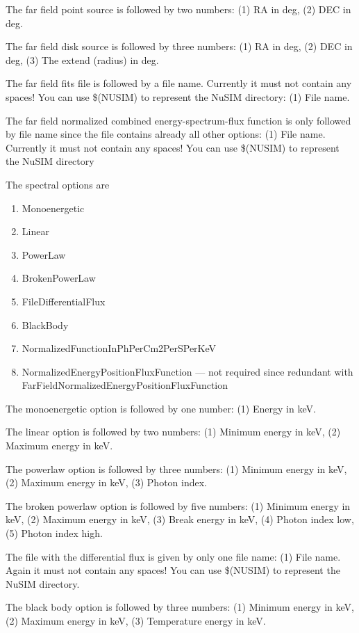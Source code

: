 The far field point source is followed by two numbers: (1) RA in deg, (2) DEC in deg.

The far field disk source is followed by three numbers: (1) RA in deg, (2) DEC in deg, (3) The extend (radius) in deg.

The far field fits file is followed by a file name. Currently it must not contain any spaces! You can use \$(NUSIM) to represent the NuSIM directory: (1) File name.

The far field normalized combined energy-spectrum-flux function is only followed by file name since the file contains already all other options: (1) File name. Currently it must not contain any spaces! You can use \$(NUSIM) to represent the NuSIM directory


The spectral options are
\begin{enumerate}
\item Monoenergetic
\item Linear
\item PowerLaw
\item BrokenPowerLaw
\item FileDifferentialFlux
\item BlackBody
\item NormalizedFunctionInPhPerCm2PerSPerKeV
\item NormalizedEnergyPositionFluxFunction --- not required since redundant with FarFieldNormalizedEnergyPositionFluxFunction
\end{enumerate}


The monoenergetic option is followed by one number: (1) Energy in keV.

The linear option is followed by two numbers: (1) Minimum energy in keV, (2) Maximum energy in keV.

The powerlaw option is followed by three numbers: (1) Minimum energy in keV, (2) Maximum energy in keV, (3) Photon index.

The broken powerlaw option is followed by five numbers: (1) Minimum energy in keV,  (2) Maximum energy in keV, (3) Break energy in keV, (4) Photon index low, (5) Photon index high.

The file with the differential flux is given by only one file name: (1) File name. Again it must not contain any spaces! You can use \$(NUSIM) to represent the NuSIM directory.

The black body option is followed by three numbers: (1) Minimum energy in keV, (2) Maximum energy in keV, (3) Temperature energy in keV.

